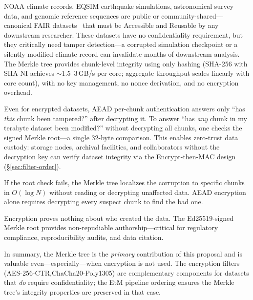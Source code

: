 \documentclass[11pt]{article}
\begin{document}
\begin{description}[nosep]
  \item[Most scientific data is unencrypted.]
    NOAA climate records, EQSIM earthquake simulations, astronomical survey
    data, and genomic reference sequences are public or community-shared---
    canonical FAIR datasets~\cite{wilkinson2016fair} that must be Accessible
    and Reusable by any downstream researcher. These datasets have no
    confidentiality requirement, but they critically need tamper
    detection---a corrupted simulation checkpoint or a silently modified
    climate record can invalidate months of downstream analysis. The Merkle
    tree provides chunk-level integrity using only hashing (SHA-256 with SHA-NI
    achieves $\sim$1.5--3\,GB/s per core; aggregate throughput scales linearly
    with core count), with no key management, no nonce derivation, and no
    encryption overhead.
  \item[Whole-dataset verification without decryption.]
    Even for encrypted datasets, AEAD per-chunk authentication answers only
    ``has \emph{this} chunk been tampered?'' after decrypting it. To answer
    ``has \emph{any} chunk in my terabyte dataset been modified?'' without
    decrypting all chunks, one checks the signed Merkle root---a single
    32-byte comparison. This enables zero-trust data custody: storage nodes,
    archival facilities, and collaborators without the decryption key can
    verify dataset integrity via the Encrypt-then-MAC design
    (\S\ref{sec:filter-order}).
  \item[Tamper localization without decryption.]
    If the root check fails, the Merkle tree localizes the corruption to
    specific chunks in $O(\log N)$ without reading or decrypting unaffected
    data. AEAD encryption alone requires decrypting every suspect chunk to
    find the bad one.
  \item[Provenance and non-repudiation.]
    Encryption proves nothing about who created the data. The Ed25519-signed
    Merkle root provides non-repudiable authorship---critical for regulatory
    compliance, reproducibility audits, and data citation.
\end{description}

\noindent In summary, the Merkle tree is the \emph{primary} contribution of
this proposal and is valuable even---especially---when encryption is not used.
The encryption filters (AES-256-CTR,\linebreak[1] ChaCha20-Poly1305) are complementary
components for datasets that \emph{do} require confidentiality; the EtM
pipeline ordering ensures the Merkle tree's integrity properties are preserved
in that case.
\end{document}
